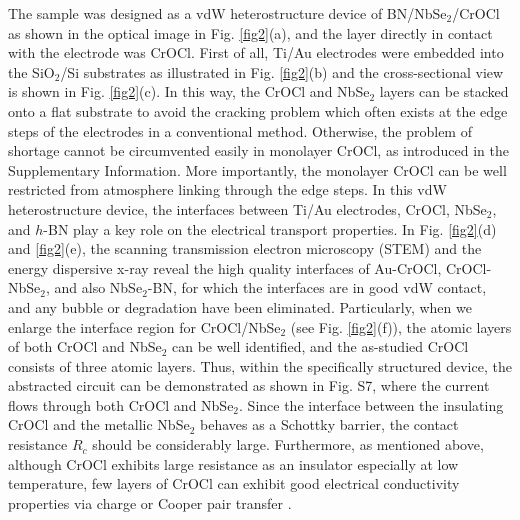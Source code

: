 \documentclass[%
 reprint,
superscriptaddress,
 amsmath,amssymb,
 aps,
]{revtex4-2}
\begin{document}
The sample was designed as a vdW heterostructure device of BN/NbSe$_2$/CrOCl as shown in the optical image in Fig. \ref{fig2}(a), and the layer directly in contact with the electrode was CrOCl. First of all, Ti/Au electrodes were embedded into the SiO$_2$/Si substrates as illustrated in Fig. \ref{fig2}(b) and the cross-sectional view is shown in Fig. \ref{fig2}(c). In this way, the CrOCl and NbSe$_2$ layers can be stacked onto a flat substrate to avoid the cracking problem which often exists at the edge steps of the electrodes in a conventional method. Otherwise, the problem of shortage cannot be circumvented easily in monolayer CrOCl, as introduced in the Supplementary Information. More importantly, the monolayer CrOCl can be well restricted from atmosphere linking through the edge steps. In this vdW heterostructure device, the interfaces between Ti/Au electrodes, CrOCl, NbSe$_2$, and $h$-BN play a key role on the electrical transport properties. In Fig. \ref{fig2}(d) and \ref{fig2}(e), the scanning transmission electron microscopy (STEM) and the energy dispersive x-ray reveal the high quality interfaces of Au-CrOCl, CrOCl-NbSe$_2$, and also NbSe$_2$-BN, for which the interfaces are in good vdW contact, and any bubble or degradation have been eliminated. Particularly, when we enlarge the interface region for CrOCl/NbSe$_2$ (see Fig. \ref{fig2}(f)), the atomic layers of both CrOCl and NbSe$_2$ can be well identified, and the as-studied CrOCl consists of three atomic layers. Thus, within the specifically structured device, the abstracted circuit can be demonstrated as shown in Fig. S7, where the current flows through both CrOCl and NbSe$_2$. Since the interface between the insulating CrOCl and the metallic NbSe$_2$ behaves as a Schottky barrier, the contact resistance $R_c$ should be considerably large. Furthermore, as mentioned above, although CrOCl exhibits large resistance as an insulator especially at low temperature, few layers of CrOCl can exhibit good electrical conductivity properties via charge or Cooper pair transfer \cite{CrOCl}.
\end{document}
